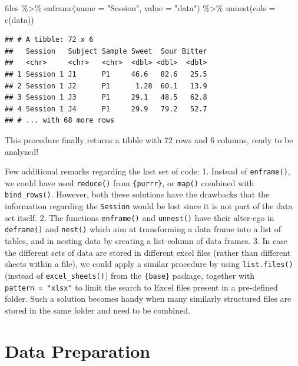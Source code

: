 \documentclass[
]{krantz}
\makeatletter
\newenvironment{Shaded}{\begin{snugshade}}{\end{snugshade}}
\newcommand{\AttributeTok}[1]{\textcolor[rgb]{0.61,0.61,0.61}{#1}}
\newcommand{\FunctionTok}[1]{\textcolor[rgb]{0,0,0}{#1}}
\newcommand{\NormalTok}[1]{#1}
\newcommand{\SpecialCharTok}[1]{\textcolor[rgb]{0,0,0}{#1}}
\newcommand{\StringTok}[1]{\textcolor[rgb]{0.5,0.5,0.5}{#1}}
\renewenvironment{quote}{\begin{VF}}{\end{VF}}
\newenvironment{kframe}{%
\medskip{}
\setlength{\fboxsep}{.8em}
 \def\at@end@of@kframe{}%
 \ifinner\ifhmode%
  \def\at@end@of@kframe{\end{minipage}}%
  \begin{minipage}{\columnwidth}%
 \fi\fi%
 \def\FrameCommand##1{\hskip\@totalleftmargin \hskip-\fboxsep
 \colorbox{shadecolor}{##1}\hskip-\fboxsep
     \hskip-\linewidth \hskip-\@totalleftmargin \hskip\columnwidth}%
 \MakeFramed {\advance\hsize-\width
   \@totalleftmargin\z@ \linewidth\hsize
   \@setminipage}}%
 {\par\unskip\endMakeFramed%
 \at@end@of@kframe}
\renewenvironment{Shaded}{\begin{kframe}}{\end{kframe}}
\makeatother
\begin{document}
\begin{Shaded}
\begin{Highlighting}[]
\NormalTok{files }\SpecialCharTok{\%\textgreater{}\%} 
  \FunctionTok{enframe}\NormalTok{(}\AttributeTok{name =} \StringTok{"Session"}\NormalTok{, }\AttributeTok{value =} \StringTok{"data"}\NormalTok{) }\SpecialCharTok{\%\textgreater{}\%} 
  \FunctionTok{unnest}\NormalTok{(}\AttributeTok{cols =} \FunctionTok{c}\NormalTok{(data))}
\end{Highlighting}
\end{Shaded}

\begin{verbatim}
## # A tibble: 72 x 6
##   Session   Subject Sample Sweet  Sour Bitter
##   <chr>     <chr>   <chr>  <dbl> <dbl>  <dbl>
## 1 Session 1 J1      P1     46.6   82.6   25.5
## 2 Session 1 J2      P1      1.28  60.1   13.9
## 3 Session 1 J3      P1     29.1   48.5   62.8
## 4 Session 1 J4      P1     29.9   79.2   52.7
## # ... with 68 more rows
\end{verbatim}

This procedure finally returns a tibble with 72 rows and 6 columns, ready to be analyzed!

\begin{quote}
Few additional remarks regarding the last set of code:
1. Instead of \texttt{enframe()}, we could have used \texttt{reduce()} from \texttt{\{purrr\}}, or \texttt{map()} combined with \texttt{bind\_rows()}. However, both these solutions have the drawbacks that the information regarding the \texttt{Session} would be lost since it is not part of the data set itself.
2. The functions \texttt{enframe()} and \texttt{unnest()} have their alter-ego in \texttt{deframe()} and \texttt{nest()} which aim at transforming a data frame into a list of tables, and in nesting data by creating a list-column of data frames.
3. In case the different sets of data are stored in different excel files (rather than different sheets within a file), we could apply a similar procedure by using \texttt{list.files()} (instead of \texttt{excel\_sheets()}) from the \texttt{\{base\}} package, together with \texttt{pattern\ =\ "xlsx"} to limit the search to Excel files present in a pre-defined folder. Such a solution becomes handy when many similarly structured files are stored in the same folder and need to be combined.
\end{quote}

\hypertarget{data-prep}{%
\chapter{Data Preparation}\label{data-prep}}
\end{document}
